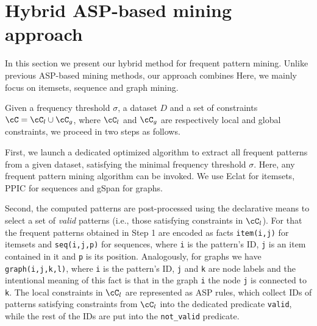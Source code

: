 \section{Hybrid ASP-based mining approach}\label{sec:problem}

In this section we present our hybrid method for frequent pattern mining. Unlike previous ASP-based mining methods, our approach combines  Here, we mainly focus on itemsets, sequence and graph mining. 

Given a frequency threshold $\sigma$, a dataset $D$ and a set of constraints $\cC=\cC_l\cup\cC_g$, where $\cC_l$ and $\cC_g$ are respectively local and global constraints, we proceed in two steps as follows. 
\bigskip

 First, we launch a dedicated optimized algorithm to extract all frequent patterns from a given dataset, satisfying the minimal frequency threshold $\sigma$. Here, any frequent pattern mining algorithm can be invoked. %
We use Eclat \parencite{eclat} for itemsets, PPIC \parencite{PPIC} for sequences and gSpan \parencite{gspan} for graphs.
\bigskip

 Second, the computed patterns are post-processed using the declarative means to select a set of \emph{valid} patterns (i.e., those satisfying constraints in $\cC_l$). For that the frequent patterns obtained in Step 1 are encoded as facts \texttt{item(i,j)} for itemsets and \texttt{seq(i,j,p)} for sequences, where \texttt{i} is the pattern's ID, \texttt{j} is an item contained in it and \texttt{p} is its position. Analogously, for graphs we have \texttt{graph(i,j,k,l)}, where \texttt{i} is the pattern's ID, \texttt{j} and \texttt{k} are node labels and the intentional meaning of this fact is that in the graph \texttt{i} the node \texttt{j} is connected to \texttt{k}. The local constraints in $\cC_l$ are represented as ASP rules, which collect IDs of patterns satisfying constraints from $\cC_l$ into the dedicated predicate \texttt{valid}, while the rest of the IDs are put into the \texttt{not\_valid} predicate. 

